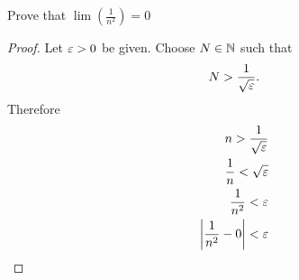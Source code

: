 \begin{eg}
	Prove that $\lim \left( \frac{1}{n^{2}} \right) = 0$
\end{eg}

\begin{proof}
	Let $\e > 0$ be given. Choose $N \in \mathbb{N}$ such that 
	\[
	N > \frac{1}{\sqrt{\e} }
	.\]
	Therefore
	\begin{align}
		n > \frac{1}{\sqrt{\e} } \\
		\frac{1}{n} < \sqrt{\e} \\
		\frac{1}{n^{2}} < \e \\
		\left|\frac{1}{n^{2}} - 0\right| < \e
	\end{align}
\end{proof}



